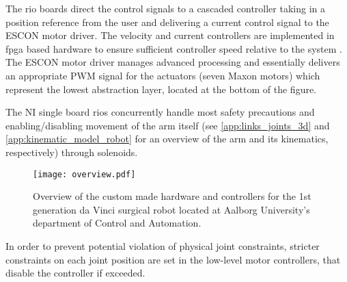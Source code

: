 The \gls{rio} boards direct the control signals to a cascaded controller taking in a position reference from the user and delivering a current control signal to the ESCON motor driver. The velocity and current controllers are implemented in \gls{fpga} based hardware to ensure sufficient controller speed relative to the system \citep{bib:robot_paper}. The ESCON motor driver manages advanced processing and essentially delivers an appropriate PWM signal for the actuators (seven Maxon motors) which represent the lowest abstraction layer, located at the bottom of the figure.

The NI single board \glspl{rio} concurrently handle most safety precautions and enabling/disabling movement of the arm itself (see \autoref{app:links_joints_3d} and \ref{app:kinematic_model_robot} for an overview of the arm and its kinematics, respectively) through solenoids.
\begin{figure}[H]
\hspace*{-5mm}
\texttt{[image: overview.pdf]}	
\caption{Overview of the custom made hardware and controllers for the 1st generation da Vinci surgical robot located at Aalborg University's department of Control and Automation.}
\label{fig:overview}
\end{figure}

In order to prevent potential violation of physical joint constraints, stricter constraints on each joint position are set in the low-level motor controllers, that disable the controller if exceeded.


